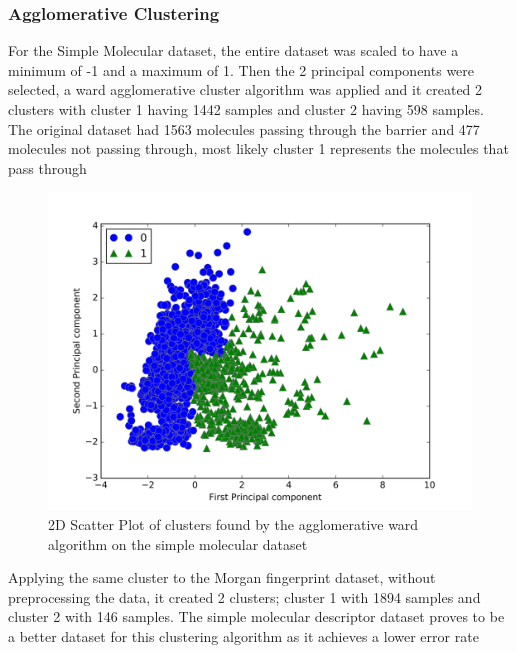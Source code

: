 \documentclass[a4paper,12pt]{report}
\begin{document}
			\subsubsection{Agglomerative Clustering}
			For the Simple Molecular dataset, the entire dataset was scaled to have a minimum of -1 and a maximum of 1. Then the 2 principal components were selected, a ward agglomerative cluster algorithm was applied and it created 2 clusters with cluster 1 having 1442 samples and cluster 2 having 598 samples. The original dataset had 1563 molecules passing through the barrier and 477 molecules not passing through, most likely cluster 1 represents the molecules that pass through
			\begin{figure}[H]
				\centering
				\includegraphics[width=\textwidth,scale=1,totalheight=0.4\textheight]{images/agg_smd_scatter}
				\caption{2D Scatter Plot of clusters found by the agglomerative ward algorithm on the simple molecular dataset}
				\label{fig:agg_smd_scatter}
			\end{figure}
			Applying the same cluster to the Morgan fingerprint dataset, without preprocessing the data, it created 2 clusters; cluster 1 with 1894 samples and cluster 2 with 146 samples. The simple molecular descriptor dataset proves to be a better dataset for this clustering algorithm as it achieves a lower error rate
\end{document}
